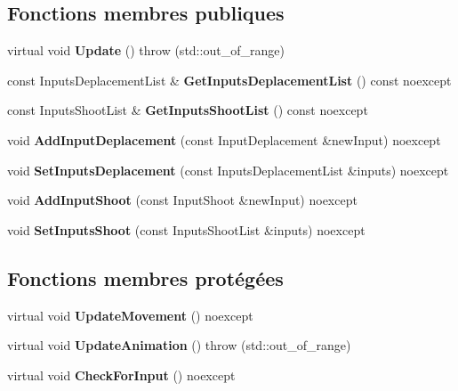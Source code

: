 \subsection*{Fonctions membres publiques}
\begin{DoxyCompactItemize}
\item 
\mbox{\label{classmy_1_1Player_a820feb1a40c3deba61cbdc071ac9cb86}} 
virtual void {\bfseries Update} ()  throw (std\+::out\+\_\+of\+\_\+range)
\item 
\mbox{\label{classmy_1_1Player_ac438258671e2f52e919504f6f20618c6}} 
const Inputs\+Deplacement\+List \& {\bfseries Get\+Inputs\+Deplacement\+List} () const noexcept
\item 
\mbox{\label{classmy_1_1Player_a7bb88e90838652f3783bacf974db3629}} 
const Inputs\+Shoot\+List \& {\bfseries Get\+Inputs\+Shoot\+List} () const noexcept
\item 
\mbox{\label{classmy_1_1Player_ab009b7c70c71bd7521583412db111c97}} 
void {\bfseries Add\+Input\+Deplacement} (const Input\+Deplacement \&new\+Input) noexcept
\item 
\mbox{\label{classmy_1_1Player_a832f4a9537e458445c8d39a5969b9d6d}} 
void {\bfseries Set\+Inputs\+Deplacement} (const Inputs\+Deplacement\+List \&inputs) noexcept
\item 
\mbox{\label{classmy_1_1Player_a4580a4732f53ed6af460de231663a3f6}} 
void {\bfseries Add\+Input\+Shoot} (const Input\+Shoot \&new\+Input) noexcept
\item 
\mbox{\label{classmy_1_1Player_a64026024eedca5d989f597437646a773}} 
void {\bfseries Set\+Inputs\+Shoot} (const Inputs\+Shoot\+List \&inputs) noexcept
\end{DoxyCompactItemize}
\subsection*{Fonctions membres protégées}
\begin{DoxyCompactItemize}
\item 
\mbox{\label{classmy_1_1Player_a43697ac9c9c7186f19f729c7112cc7b4}} 
virtual void {\bfseries Update\+Movement} () noexcept
\item 
\mbox{\label{classmy_1_1Player_a21967319ccead43db9459e8e54923648}} 
virtual void {\bfseries Update\+Animation} ()  throw (std\+::out\+\_\+of\+\_\+range)
\item 
\mbox{\label{classmy_1_1Player_a09ac1ee496991cf5a6a071f6e4b7e08c}} 
virtual void {\bfseries Check\+For\+Input} () noexcept
\end{DoxyCompactItemize}
